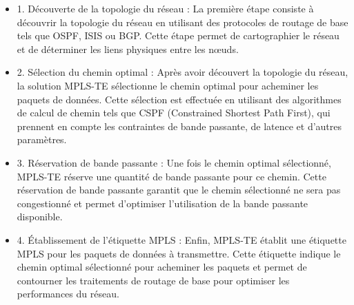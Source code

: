 \documentclass[12pt, a4paper]{article}
\begin{document}
\begin{itemize}
    \item 1. Découverte de la topologie du réseau : La première étape consiste à découvrir la topologie du réseau en utilisant des protocoles de routage de base tels que OSPF, ISIS ou BGP. Cette étape permet de cartographier le réseau et de déterminer les liens physiques entre les nœuds.
    \item 2. Sélection du chemin optimal : Après avoir découvert la topologie du réseau, la solution MPLS-TE sélectionne le chemin optimal pour acheminer les paquets de données. Cette sélection est effectuée en utilisant des algorithmes de calcul de chemin tels que CSPF (Constrained Shortest Path First), qui prennent en compte les contraintes de bande passante, de latence et d'autres paramètres.
    \item 3. Réservation de bande passante : Une fois le chemin optimal sélectionné, MPLS-TE réserve une quantité de bande passante pour ce chemin. Cette réservation de bande passante garantit que le chemin sélectionné ne sera pas congestionné et permet d'optimiser l'utilisation de la bande passante disponible.
    \item 4. Établissement de l'étiquette MPLS : Enfin, MPLS-TE établit une étiquette MPLS pour les paquets de données à transmettre. Cette étiquette indique le chemin optimal sélectionné pour acheminer les paquets et permet de contourner les traitements de routage de base pour optimiser les performances du réseau.
\end{itemize}
\end{document}
